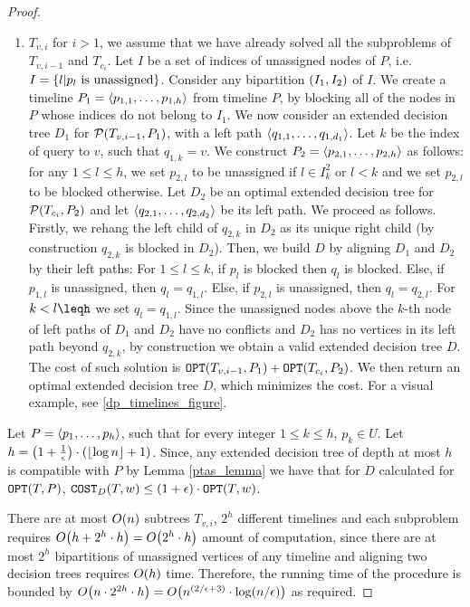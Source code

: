 \begin{theorem}
\begin{proof}
\begin{enumerate}
        \item $T_{v,i}$ for $i>1$, we assume that we have already solved all the subproblems of $T_{v,i-1}$ and $T_{c_i}$. Let $I$ be a set of indices of unassigned nodes of $P$, i.e. $I=\mathopen{}\left\{ l | p_l \text{ is unassigned} \right\}$. Consider any bipartition $\mathopen{}\left( I_1, I_2 \right)$ of $I$. We create a timeline $P_1=\mathopen{}\langle p_{1,1},\dots,p_{1,h} \rangle$ from timeline $P$, by blocking all of the nodes in $P$ whose indices do not belong to $I_1$. We now consider an extended decision tree $D_1$ for $\mathcal{P}\mathopen{}\left( T_{v,i-1}, P_1 \right)$, with a left path $\mathopen{}\langle q_{1,1},\dots,q_{1,d_1} \rangle$. Let $k$ be the index of query to $v$, such that $q_{1,k}=v$. We construct $P_2=\mathopen{}\langle p_{2,1},\dots, p_{2,h} \rangle$ as follows: for any $1\leq l\leq h$, we set $p_{2,l}$ to be unassigned if $l\in I_k^2$ or $l < k$ and we set $p_{2,l}$ to be blocked otherwise. Let $D_2$ be an optimal extended decision tree for $\mathcal{P}\mathopen{}\left( T_{c_i}, P_2 \right)$ and let $\mathopen{}\langle q_{2,1},\dots,q_{2,d_2} \rangle$ be its left path. We proceed as follows. Firstly, we rehang the left child of $q_{2,k}$ in $D_2$ as its unique right child (by construction $q_{2,k}$ is blocked in $D_2$). Then, we build $D$ by aligning $D_1$ and $D_2$ by their left paths: For $1\leq l \leq k$, if $p_l$ is blocked then $q_l$ is blocked. Else, if $p_{1,l}$ is unassigned, then $q_l=q_{1,l}$. Else, if  $p_{2,l}$ is unassigned, then $q_l=q_{2,l}$. For $k<l\leqh$ we set $q_l=q_{1,l}$. Since the unassigned nodes above the $k$-th node of left paths of $D_1$ and $D_2$ have no conflicts and $D_2$ has no vertices in its left path beyond $q_{2,k}$, by construction we obtain a valid extended decision tree $D$. The cost of such solution is $\texttt{OPT}\mathopen{}\left( T_{v,i-1}, P_1 \right)+\texttt{OPT}\mathopen{}\left( T_{c_i}, P_2 \right)$. We then return an optimal extended decision tree $D$, which minimizes the cost. For a visual example, see \ref{dp_timelines_figure}.
    \end{enumerate}
    

    Let $P=\mathopen{}\langle p_1,\dots,p_h \rangle$, such that for every integer $1\leq k \leq h$, $p_k\in U$. Let $h=\mathopen{}\left( 1+\frac{1}{\epsilon} \right)\cdot\mathopen{}\left( \mathopen{}\left\lfloor \log n \right\rfloor+1 \right)$. Since, any extended decision tree of depth at most $h$ is compatible with $P$ by Lemma \ref{ptas_lemma} we have that for $D$ calculated for $\texttt{OPT}\mathopen{}\left( T, P \right)$,
    $\texttt{COST}_{D}\mathopen{}\left( T,w \right)\leq \mathopen{}\left( 1+\epsilon \right)\cdot\texttt{OPT}\mathopen{}\left( T,w \right)$.

    There are at most $O\mathopen{}\left( n \right)$ subtrees $T_{v,i}$, $2^h$ different timelines and each subproblem requires $O\mathopen{}\left( h+2^h\cdot h \right)=O\mathopen{}\left( 2^h\cdot h \right)$ amount of computation, since there are at most $2^h$ bipartitions of unassigned vertices of any timeline and aligning two decision trees requires $O\mathopen{}\left( h \right)$ time. Therefore, the running time of the procedure is bounded by $O\mathopen{}\left( n\cdot 2^{2h}\cdot h \right)=O\mathopen{}\left( n^{\mathopen{}\left( 2/\epsilon+3 \right)}\cdot \log \mathopen{}\left( n/\epsilon \right) \right)$ as required.
    
\end{proof}
\end{theorem}